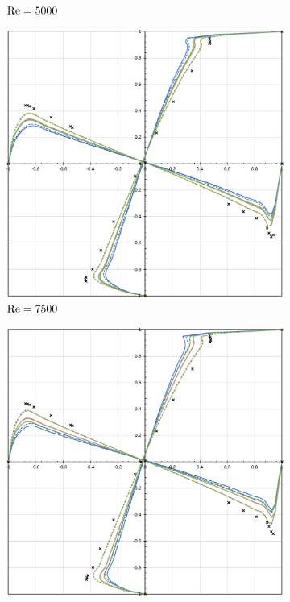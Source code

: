 \begin{figure}[h!]
\begin{subfigure}{0.4\textwidth}
        \caption{$\mathrm{Re}=5000$}
    \end{subfigure}
    \begin{subfigure}{0.4\textwidth}
        \includegraphics[width=\linewidth]{Figuras/Cavity/Re7500.pdf}
        \caption{$\mathrm{Re}=7500$}
    \end{subfigure}
    \begin{subfigure}{0.4\textwidth}
        \includegraphics[width=\linewidth]{Figuras/Cavity/Re10000.pdf}

\end{subfigure}
\end{figure}
